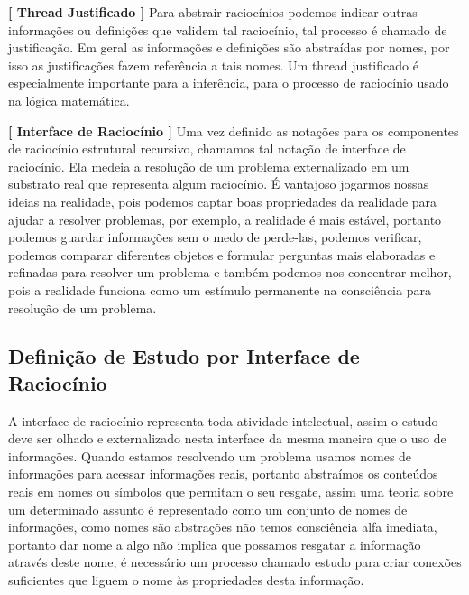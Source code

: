 \documentclass[10pt,a4paper]{report}
\begin{document}
\hspace{\baselineskip}

\textbf{[ Thread Justificado ]} Para abstrair raciocínios podemos indicar outras informações ou definições que validem tal raciocínio, tal processo é chamado de justificação. Em geral as informações e definições são abstraídas por nomes, por isso as justificações fazem referência a tais nomes. Um thread justificado é especialmente importante para a inferência, para o processo de raciocínio usado na lógica matemática.


\hspace{\baselineskip}

\textbf{[ Interface de Raciocínio ]} Uma vez definido as notações para os componentes de raciocínio estrutural recursivo, chamamos tal notação de interface de raciocínio. Ela medeia a resolução de um problema externalizado em um substrato real que representa algum raciocínio. É vantajoso jogarmos nossas ideias na realidade, pois podemos captar boas propriedades da realidade para ajudar a resolver problemas, por exemplo, a realidade é mais estável, portanto podemos guardar informações sem o medo de perde-las, podemos verificar, podemos comparar diferentes objetos e formular perguntas mais elaboradas e refinadas para resolver um problema e também podemos nos concentrar melhor, pois a realidade funciona como um estímulo permanente na consciência para resolução de um problema.


\subsection{Definição de Estudo por Interface de Raciocínio}

\hspace{\baselineskip}

A interface de raciocínio representa toda atividade intelectual, assim o estudo deve ser olhado e externalizado nesta interface da mesma maneira que o uso de informações. Quando estamos resolvendo um problema usamos nomes de informações para acessar informações reais, portanto abstraímos os conteúdos reais em nomes ou símbolos que permitam o seu resgate, assim uma teoria sobre um determinado assunto é representado como um conjunto de nomes de informações, como nomes são abstrações não temos consciência alfa imediata, portanto dar nome a algo não implica que possamos resgatar a informação através deste nome, é necessário um processo chamado estudo para criar conexões suficientes que liguem o nome às propriedades desta informação.\\
\end{document}
